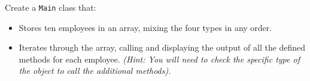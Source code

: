 Create a \texttt{Main} class that:

\begin{itemize}

    \item Stores ten employees in an array, mixing the four types in any order.

    \item Iterates through the array, calling and displaying the output of all the defined methods for each employee. \textit{(Hint: You will need to check the specific type of the object to call the additional methods).}

\end{itemize}
